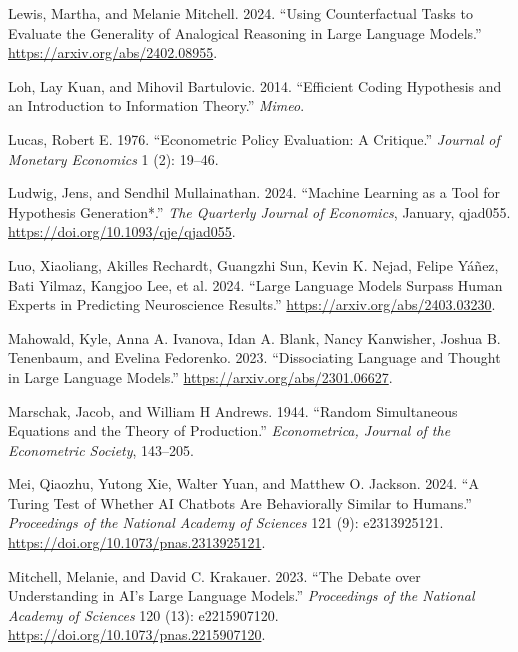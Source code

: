 \documentclass[
]{article}
\newlength{\cslhangindent}
\newenvironment{CSLReferences}[2] %
 {\begin{list}{}{%
  \setlength{\itemindent}{0pt}
  \setlength{\leftmargin}{0pt}
  \setlength{\parsep}{0pt}
  \ifodd #1
   \setlength{\leftmargin}{\cslhangindent}
   \setlength{\itemindent}{-1\cslhangindent}
  \fi
  \setlength{\itemsep}{#2\baselineskip}}}
 {\end{list}}
\begin{document}
\begin{CSLReferences}{1}{0}
Lewis, Martha, and Melanie Mitchell. 2024. {``Using Counterfactual Tasks
to Evaluate the Generality of Analogical Reasoning in Large Language
Models.''} \url{https://arxiv.org/abs/2402.08955}.

Loh, Lay Kuan, and Mihovil Bartulovic. 2014. {``Efficient Coding
Hypothesis and an Introduction to Information Theory.''} \emph{Mimeo}.

Lucas, Robert E. 1976. {``Econometric Policy Evaluation: A Critique.''}
\emph{Journal of Monetary Economics} 1 (2): 19--46.

Ludwig, Jens, and Sendhil Mullainathan. 2024. {``{Machine Learning as a
Tool for Hypothesis Generation*}.''} \emph{The Quarterly Journal of
Economics}, January, qjad055. \url{https://doi.org/10.1093/qje/qjad055}.

Luo, Xiaoliang, Akilles Rechardt, Guangzhi Sun, Kevin K. Nejad, Felipe
Yáñez, Bati Yilmaz, Kangjoo Lee, et al. 2024. {``Large Language Models
Surpass Human Experts in Predicting Neuroscience Results.''}
\url{https://arxiv.org/abs/2403.03230}.

Mahowald, Kyle, Anna A. Ivanova, Idan A. Blank, Nancy Kanwisher, Joshua
B. Tenenbaum, and Evelina Fedorenko. 2023. {``Dissociating Language and
Thought in Large Language Models.''}
\url{https://arxiv.org/abs/2301.06627}.

Marschak, Jacob, and William H Andrews. 1944. {``Random Simultaneous
Equations and the Theory of Production.''} \emph{Econometrica, Journal
of the Econometric Society}, 143--205.

Mei, Qiaozhu, Yutong Xie, Walter Yuan, and Matthew O. Jackson. 2024.
{``A Turing Test of Whether AI Chatbots Are Behaviorally Similar to
Humans.''} \emph{Proceedings of the National Academy of Sciences} 121
(9): e2313925121. \url{https://doi.org/10.1073/pnas.2313925121}.

Mitchell, Melanie, and David C. Krakauer. 2023. {``The Debate over
Understanding in AI's Large Language Models.''} \emph{Proceedings of the
National Academy of Sciences} 120 (13): e2215907120.
\url{https://doi.org/10.1073/pnas.2215907120}.


\end{CSLReferences}
\end{document}
